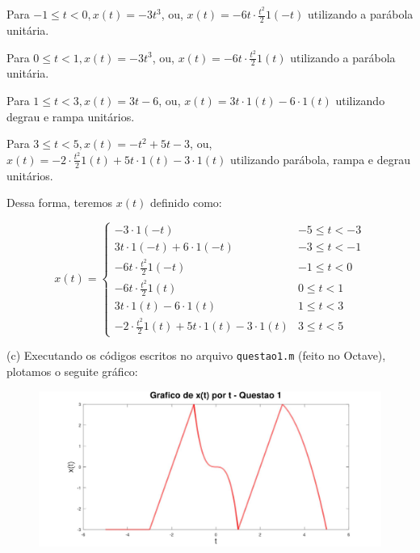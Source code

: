 \documentclass{article}
\begin{document}
\vspace{\baselineskip}

Para $ -1 \leq t < 0, x(t) = -3t^3 $, ou, $ x(t) = -6t \cdot \frac{t^2}{2}1(-t) $ utilizando a parábola unitária.

\vspace{\baselineskip}

Para $ 0 \leq t < 1, x(t) = -3t^3 $, ou, $ x(t) = -6t \cdot \frac{t^2}{2}1(t) $ utilizando a parábola unitária.

\vspace{\baselineskip}

Para $ 1 \leq t < 3, x(t) = 3t - 6 $, ou, $ x(t) = 3t \cdot 1(t) - 6 \cdot 1(t) $ utilizando degrau e rampa unitários.

\vspace{\baselineskip}

Para $ 3 \leq t < 5, x(t) = -t^2 + 5t - 3 $, ou, $ x(t) = -2 \cdot \frac{t^2}{2}1(t) + 5t \cdot 1(t) - 3 \cdot 1(t)$ utilizando parábola, rampa e degrau unitários.

\vspace{\baselineskip}

Dessa forma, teremos $x(t)$ definido como:

\[ x(t) = 
\begin{cases} 
    -3 \cdot 1(-t) & -5 \leq t < -3 \\

    3t \cdot 1(-t) + 6 \cdot 1(-t) & -3 \leq t < -1 \\

    -6t \cdot \frac{t^2}{2}1(-t) & -1 \leq t < 0 \\

    -6t \cdot \frac{t^2}{2}1(t) & 0 \leq t < 1 \\

    3t \cdot 1(t) - 6 \cdot 1(t) & 1 \leq t < 3 \\

    -2 \cdot \frac{t^2}{2}1(t) + 5t \cdot 1(t) - 3 \cdot 1(t) & 3 \leq t < 5 
 \end{cases}
\]


\vspace{\baselineskip}

(c) Executando os códigos escritos no arquivo {\tt questao1.m} (feito no Octave), plotamos o seguite gráfico:

\begin{figure}[h]
    \includegraphics[scale=0.23]{plot1c}
    \centering
\end{figure}
\end{document}
